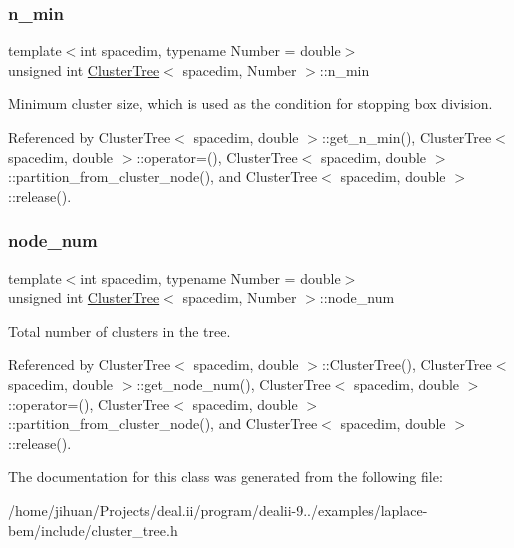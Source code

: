 \mbox{\label{classClusterTree_a5af4448800c4ddc98121706754bfe3f9}} 
\subsubsection{\texorpdfstring{n\+\_\+min}{n\_min}}
{\footnotesize\ttfamily template$<$int spacedim, typename Number = double$>$ \\
unsigned int \hyperlink{classClusterTree}{Cluster\+Tree}$<$ spacedim, Number $>$\+::n\+\_\+min\hspace{0.3cm}{\ttfamily [private]}}

Minimum cluster size, which is used as the condition for stopping box division. 

Referenced by Cluster\+Tree$<$ spacedim, double $>$\+::get\+\_\+n\+\_\+min(), Cluster\+Tree$<$ spacedim, double $>$\+::operator=(), Cluster\+Tree$<$ spacedim, double $>$\+::partition\+\_\+from\+\_\+cluster\+\_\+node(), and Cluster\+Tree$<$ spacedim, double $>$\+::release().

\mbox{\label{classClusterTree_a6b352489be3ca9217d31966c24ee02a1}} 
\subsubsection{\texorpdfstring{node\+\_\+num}{node\_num}}
{\footnotesize\ttfamily template$<$int spacedim, typename Number = double$>$ \\
unsigned int \hyperlink{classClusterTree}{Cluster\+Tree}$<$ spacedim, Number $>$\+::node\+\_\+num\hspace{0.3cm}{\ttfamily [private]}}

Total number of clusters in the tree. 

Referenced by Cluster\+Tree$<$ spacedim, double $>$\+::\+Cluster\+Tree(), Cluster\+Tree$<$ spacedim, double $>$\+::get\+\_\+node\+\_\+num(), Cluster\+Tree$<$ spacedim, double $>$\+::operator=(), Cluster\+Tree$<$ spacedim, double $>$\+::partition\+\_\+from\+\_\+cluster\+\_\+node(), and Cluster\+Tree$<$ spacedim, double $>$\+::release().



The documentation for this class was generated from the following file\+:\begin{DoxyCompactItemize}
\item 
/home/jihuan/\+Projects/deal.\+ii/program/dealii-\/9../examples/laplace-\/bem/include/cluster\+\_\+tree.\+h\end{DoxyCompactItemize}
